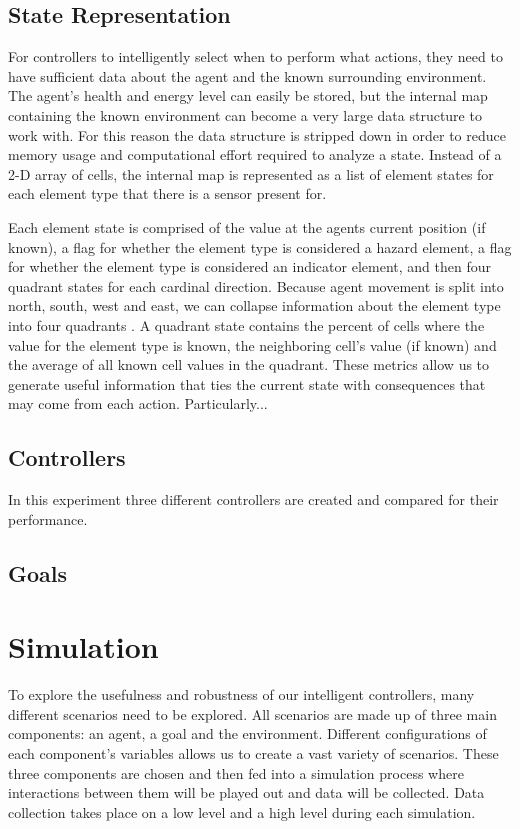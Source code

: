 \documentclass[]{report}
\begin{document}
\subsection{State Representation}
For controllers to intelligently select when to perform what actions, they need to have sufficient data about the agent and the known surrounding environment.
The agent's health and energy level can easily be stored, but the internal map containing the known environment can become a very large data structure to work with.
For this reason the data structure is stripped down in order to reduce memory usage and computational effort required to analyze a state.
Instead of a 2-D array of cells,  the internal map is represented as a list of element states for each element type that there is a sensor present for.

Each element state is comprised of the value at the agents current position (if known), a flag for whether the element type is considered a hazard element, a flag for whether the element type is considered an indicator element, and then four quadrant states for each cardinal direction.
Because agent movement is split into north, south, west and east, we can collapse information about the element type into four quadrants .
A quadrant state contains the percent of cells where the value for the element type is known, the neighboring cell's value (if known) and the average of all known cell values in the quadrant.
These metrics allow us to generate useful information that ties the current state with consequences that may come from each action.
Particularly...



\subsection{Controllers}
In this experiment three different controllers are created and compared for their performance.

\subsection{Goals}


\section{Simulation}
To explore the usefulness and robustness of our intelligent controllers, many different scenarios need to be explored.
All scenarios are made up of three main components: an agent, a goal and the environment.
Different configurations of each component's variables allows us to create a vast variety of scenarios.
These three components are chosen and then fed into a simulation process  where interactions between them will be played out and data will be collected.
Data collection takes place on a low level and a high level during each simulation.
\end{document}
